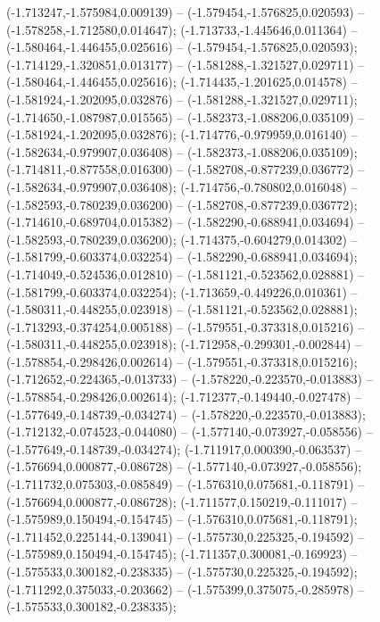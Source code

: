 (-1.713247,-1.575984,0.009139) -- (-1.579454,-1.576825,0.020593) -- (-1.578258,-1.712580,0.014647);
 (-1.713733,-1.445646,0.011364) -- (-1.580464,-1.446455,0.025616) -- (-1.579454,-1.576825,0.020593);
 (-1.714129,-1.320851,0.013177) -- (-1.581288,-1.321527,0.029711) -- (-1.580464,-1.446455,0.025616);
 (-1.714435,-1.201625,0.014578) -- (-1.581924,-1.202095,0.032876) -- (-1.581288,-1.321527,0.029711);
 (-1.714650,-1.087987,0.015565) -- (-1.582373,-1.088206,0.035109) -- (-1.581924,-1.202095,0.032876);
 (-1.714776,-0.979959,0.016140) -- (-1.582634,-0.979907,0.036408) -- (-1.582373,-1.088206,0.035109);
 (-1.714811,-0.877558,0.016300) -- (-1.582708,-0.877239,0.036772) -- (-1.582634,-0.979907,0.036408);
 (-1.714756,-0.780802,0.016048) -- (-1.582593,-0.780239,0.036200) -- (-1.582708,-0.877239,0.036772);
 (-1.714610,-0.689704,0.015382) -- (-1.582290,-0.688941,0.034694) -- (-1.582593,-0.780239,0.036200);
 (-1.714375,-0.604279,0.014302) -- (-1.581799,-0.603374,0.032254) -- (-1.582290,-0.688941,0.034694);
 (-1.714049,-0.524536,0.012810) -- (-1.581121,-0.523562,0.028881) -- (-1.581799,-0.603374,0.032254);
 (-1.713659,-0.449226,0.010361) -- (-1.580311,-0.448255,0.023918) -- (-1.581121,-0.523562,0.028881);
 (-1.713293,-0.374254,0.005188) -- (-1.579551,-0.373318,0.015216) -- (-1.580311,-0.448255,0.023918);
 (-1.712958,-0.299301,-0.002844) -- (-1.578854,-0.298426,0.002614) -- (-1.579551,-0.373318,0.015216);
 (-1.712652,-0.224365,-0.013733) -- (-1.578220,-0.223570,-0.013883) -- (-1.578854,-0.298426,0.002614);
 (-1.712377,-0.149440,-0.027478) -- (-1.577649,-0.148739,-0.034274) -- (-1.578220,-0.223570,-0.013883);
 (-1.712132,-0.074523,-0.044080) -- (-1.577140,-0.073927,-0.058556) -- (-1.577649,-0.148739,-0.034274);
 (-1.711917,0.000390,-0.063537) -- (-1.576694,0.000877,-0.086728) -- (-1.577140,-0.073927,-0.058556);
 (-1.711732,0.075303,-0.085849) -- (-1.576310,0.075681,-0.118791) -- (-1.576694,0.000877,-0.086728);
 (-1.711577,0.150219,-0.111017) -- (-1.575989,0.150494,-0.154745) -- (-1.576310,0.075681,-0.118791);
 (-1.711452,0.225144,-0.139041) -- (-1.575730,0.225325,-0.194592) -- (-1.575989,0.150494,-0.154745);
 (-1.711357,0.300081,-0.169923) -- (-1.575533,0.300182,-0.238335) -- (-1.575730,0.225325,-0.194592);
 (-1.711292,0.375033,-0.203662) -- (-1.575399,0.375075,-0.285978) -- (-1.575533,0.300182,-0.238335);
